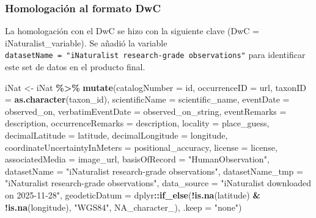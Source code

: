 \documentclass[sn-apa,pdflatex]{sn-jnl}
\newenvironment{Shaded}{\begin{snugshade}}{\end{snugshade}}
\newcommand{\AttributeTok}[1]{\textcolor[rgb]{0.13,0.29,0.53}{#1}}
\newcommand{\ConstantTok}[1]{\textcolor[rgb]{0.56,0.35,0.01}{#1}}
\newcommand{\FunctionTok}[1]{\textcolor[rgb]{0.13,0.29,0.53}{\textbf{#1}}}
\newcommand{\NormalTok}[1]{#1}
\newcommand{\OtherTok}[1]{\textcolor[rgb]{0.56,0.35,0.01}{#1}}
\newcommand{\SpecialCharTok}[1]{\textcolor[rgb]{0.81,0.36,0.00}{\textbf{#1}}}
\newcommand{\StringTok}[1]{\textcolor[rgb]{0.31,0.60,0.02}{#1}}
\begin{document}
\subsubsection{Homologación al formato
DwC}\label{homologaciuxf3n-al-formato-dwc-4}

La homologación con el DwC se hizo con la siguiente clave (DwC =
iNaturalist\_variable). Se añadió la variable
\texttt{datasetName\ =\ "iNaturalist\ research-grade\ observations"}
para identificar este set de datos en el producto final.

\begin{Shaded}
\begin{Highlighting}[]
\NormalTok{iNat }\OtherTok{\textless{}{-}}\NormalTok{ iNat }\SpecialCharTok{\%\textgreater{}\%}
    \FunctionTok{mutate}\NormalTok{(}\AttributeTok{catalogNumber =}\NormalTok{ id, }\AttributeTok{occurrenceID =}\NormalTok{ url, }\AttributeTok{taxonID =} \FunctionTok{as.character}\NormalTok{(taxon\_id),}
        \AttributeTok{scientificName =}\NormalTok{ scientific\_name, }\AttributeTok{eventDate =}\NormalTok{ observed\_on,}
        \AttributeTok{verbatimEventDate =}\NormalTok{ observed\_on\_string, }\AttributeTok{eventRemarks =}\NormalTok{ description,}
        \AttributeTok{occurrenceRemarks =}\NormalTok{ description, }\AttributeTok{locality =}\NormalTok{ place\_guess,}
        \AttributeTok{decimalLatitude =}\NormalTok{ latitude, }\AttributeTok{decimalLongitude =}\NormalTok{ longitude,}
        \AttributeTok{coordinateUncertaintyInMeters =}\NormalTok{ positional\_accuracy,}
        \AttributeTok{license =}\NormalTok{ license, }\AttributeTok{associatedMedia =}\NormalTok{ image\_url, }\AttributeTok{basisOfRecord =} \StringTok{"HumanObservation"}\NormalTok{,}
        \AttributeTok{datasetName =} \StringTok{"iNaturalist research{-}grade observations"}\NormalTok{,}
        \AttributeTok{datasetName\_tmp =} \StringTok{"iNaturalist research{-}grade observations"}\NormalTok{,}
        \AttributeTok{data\_source =} \StringTok{"iNaturalist downloaded on 2025{-}11{-}28"}\NormalTok{,}
        \AttributeTok{geodeticDatum =}\NormalTok{ dplyr}\SpecialCharTok{::}\FunctionTok{if\_else}\NormalTok{(}\SpecialCharTok{!}\FunctionTok{is.na}\NormalTok{(latitude) }\SpecialCharTok{\&} \SpecialCharTok{!}\FunctionTok{is.na}\NormalTok{(longitude),}
            \StringTok{"WGS84"}\NormalTok{, }\ConstantTok{NA\_character\_}\NormalTok{), }\AttributeTok{.keep =} \StringTok{"none"}\NormalTok{)}
\end{Highlighting}
\end{Shaded}
\end{document}
